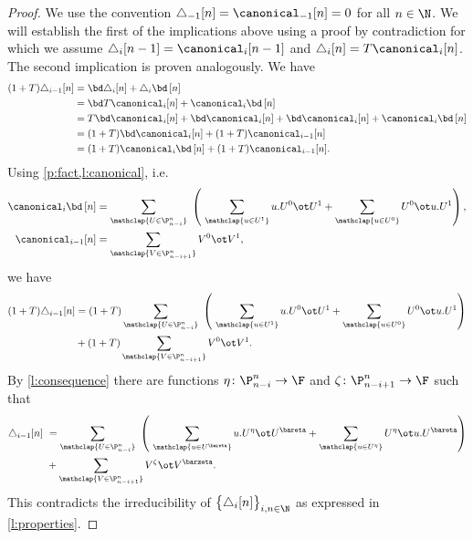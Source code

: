 \begin{proof}
	We use the convention $\triangle_{-1} [n] = \canonical_{-1} [n] = 0$ for all $n \in \N$.
	We will establish the first of the implications above using a proof by contradiction for which we assume $\triangle_i [n-1] = \canonical_i [n-1]$ and $\triangle_i [n] = T \canonical_i [n]$.
	The second implication is proven analogously.
	We have
	\begin{align*}
		(1+T) \triangle_{i-1}[n] &=
		\bd \triangle_i [n] + \triangle_i \bd \, [n] \\ &=
		\bd T \canonical_i [n] + \canonical_i \bd \, [n] \\ &=
		T \bd \canonical_i [n] + \bd \canonical_i [n] + \bd \canonical_i [n] + \canonical_i \bd \, [n] \\ &=
		(1+T) \bd \canonical_i [n] + (1+T) \canonical_{i-1} [n] \\ &=
		(1+T) \canonical_i \bd \, [n] + (1+T) \canonical_{i-1} [n].
	\end{align*}
	Using \cref{p:fact,l:canonical}, i.e.
	\[
	\begin{split}
		\canonical_i \bd \, [n] &=
		\sum_{\mathclap{U \in \P_{n-i}^n}} \
		\left(\
		\sum_{\mathclap{u \in U^1}} u.U^0 \ot U^1 +
		\sum_{\mathclap{u \in U^0}} U^0 \ot u.U^1
		\right), \\
		\canonical_{i-1} [n] &=
		\sum_{\mathclap{V \in \P_{n-i+1}^n}} V^0 \ot V^1,
	\end{split}
	\]
	we have
	\begin{align*}
		(1+T) \triangle_{i-1}[n] &=
		(1+T) \sum_{\mathclap{U \in \P_{n-i}^n}} \
		\left(\
		\sum_{\mathclap{u \in U^1}} u.U^0 \ot U^1 +
		\sum_{\mathclap{u \in U^0}} U^0 \ot u.U^1
		\right) \\ &+
		(1+T) \sum_{\mathclap{V \in \P_{n-i+1}^n}} V^0 \ot V^1.
	\end{align*}
	By \cref{l:consequence} there are functions $\eta \colon \P_{n-i}^n \to \F$ and $\zeta \colon \P_{n-i+1}^n \to \F$ such that
	\begin{align*}
		\triangle_{i-1}[n] \ &=
		\sum_{\mathclap{U \in \P_{n-i}^n}} \
		\left(\
		\sum_{\mathclap{u \in U^\bareta}} u.U^\eta \ot U^\bareta +
		\sum_{\mathclap{u \in U^\eta}} U^\eta \ot u.U^\bareta
		\right) \\ &+
		\sum_{\mathclap{V \in \P_{n-i+1}^n}} V^\zeta \ot V^\barzeta.
	\end{align*}
	This contradicts the irreducibility of $\big\{ \triangle_i [n] \big\}_{i,n \in \N}$ as expressed in \cref{l:properties}.
\end{proof}

